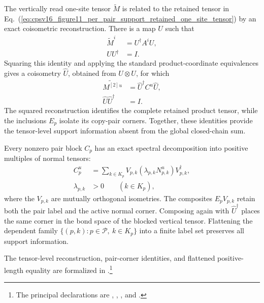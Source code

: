 \documentclass{article}
\begin{document}
The vertically read one-site tensor $\widetilde M$ is related to the retained
tensor in
Eq.~(\ref{eq:cpsv16_figure11_per_pair_support_retained_one_site_tensor}) by an
exact coisometric reconstruction. There is a map $U$ such that
\begin{align}
    \widetilde M^i
        &= U^\dagger A^iU,
    \label{eq:cpsv16_figure11_per_pair_support_one_site_reconstruction}\\
    UU^\dagger
        &= I.
    \label{eq:cpsv16_figure11_per_pair_support_one_site_coisometry}
\end{align}
Squaring this identity and applying the standard product-coordinate
equivalences gives a coisometry $\widehat U$, obtained from $U\otimes U$, for
which
\begin{align}
    \widetilde{M^{[2]}}{}^u
        &= \widehat U^\dagger C^u\widehat U,
    \label{eq:cpsv16_figure11_per_pair_support_squared_reconstruction}\\
    \widehat U\widehat U^\dagger
        &= I.
    \label{eq:cpsv16_figure11_per_pair_support_squared_coisometry}
\end{align}
The squared reconstruction identifies the complete retained product tensor,
while the inclusions $E_p$ isolate its copy-pair corners. Together, these
identities provide the tensor-level support information absent from the
global closed-chain sum.

Every nonzero pair block $C_p$ has an exact spectral decomposition into
positive multiples of normal tensors:
\begin{align}
    C_p^u
        &= \sum_{k\in K_p}
            V_{p,k}(\lambda_{p,k}N_{p,k}^u)V_{p,k}^\dagger,
    \label{eq:cpsv16_figure11_per_pair_support_local_spectral_decomposition}\\
    \lambda_{p,k}
        &> 0
        \qquad (k\in K_p),
    \label{eq:cpsv16_figure11_per_pair_support_positive_spectral_weights}
\end{align}
where the $V_{p,k}$ are mutually orthogonal isometries. The composites
$E_pV_{p,k}$ retain both the pair label and the active normal corner.
Composing again with $\widehat U^\dagger$ places the same corner in the bond
space of the blocked vertical tensor. Flattening the dependent family
$\{(p,k):p\in\mathcal P,\ k\in K_p\}$ into a finite label set preserves all
support information.

The tensor-level reconstruction, pair-corner identities, and flattened
positive-length equality are formalized in
.\footnote{The
principal declarations are
,
,
,
and
.}
\end{document}
